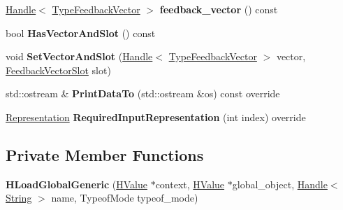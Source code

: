 \begin{DoxyCompactItemize}
\item 
\hyperlink{classv8_1_1internal_1_1_handle}{Handle}$<$ \hyperlink{classv8_1_1internal_1_1_type_feedback_vector}{Type\+Feedback\+Vector} $>$ {\bfseries feedback\+\_\+vector} () const \hypertarget{classv8_1_1internal_1_1_h_load_global_generic_a5fe6871107985c3d5630f3eb6931e637}{}\label{classv8_1_1internal_1_1_h_load_global_generic_a5fe6871107985c3d5630f3eb6931e637}

\item 
bool {\bfseries Has\+Vector\+And\+Slot} () const \hypertarget{classv8_1_1internal_1_1_h_load_global_generic_ad9cb94ceb7a09aad1b4e37ae0c44258e}{}\label{classv8_1_1internal_1_1_h_load_global_generic_ad9cb94ceb7a09aad1b4e37ae0c44258e}

\item 
void {\bfseries Set\+Vector\+And\+Slot} (\hyperlink{classv8_1_1internal_1_1_handle}{Handle}$<$ \hyperlink{classv8_1_1internal_1_1_type_feedback_vector}{Type\+Feedback\+Vector} $>$ vector, \hyperlink{classv8_1_1internal_1_1_feedback_vector_slot}{Feedback\+Vector\+Slot} slot)\hypertarget{classv8_1_1internal_1_1_h_load_global_generic_a83b3d860022539da6db17e80f33bf33c}{}\label{classv8_1_1internal_1_1_h_load_global_generic_a83b3d860022539da6db17e80f33bf33c}

\item 
std\+::ostream \& {\bfseries Print\+Data\+To} (std\+::ostream \&os) const  override\hypertarget{classv8_1_1internal_1_1_h_load_global_generic_a1a4dfadb3c4609d6666e2261aff6012d}{}\label{classv8_1_1internal_1_1_h_load_global_generic_a1a4dfadb3c4609d6666e2261aff6012d}

\item 
\hyperlink{classv8_1_1internal_1_1_representation}{Representation} {\bfseries Required\+Input\+Representation} (int index) override\hypertarget{classv8_1_1internal_1_1_h_load_global_generic_a94e7d9019b562d808545dee1a6e2d735}{}\label{classv8_1_1internal_1_1_h_load_global_generic_a94e7d9019b562d808545dee1a6e2d735}

\end{DoxyCompactItemize}
\subsection*{Private Member Functions}
\begin{DoxyCompactItemize}
\item 
{\bfseries H\+Load\+Global\+Generic} (\hyperlink{classv8_1_1internal_1_1_h_value}{H\+Value} $\ast$context, \hyperlink{classv8_1_1internal_1_1_h_value}{H\+Value} $\ast$global\+\_\+object, \hyperlink{classv8_1_1internal_1_1_handle}{Handle}$<$ \hyperlink{classv8_1_1internal_1_1_string}{String} $>$ name, Typeof\+Mode typeof\+\_\+mode)\hypertarget{classv8_1_1internal_1_1_h_load_global_generic_a6bc852b068e5890e8cfbff0bf0271924}{}\label{classv8_1_1internal_1_1_h_load_global_generic_a6bc852b068e5890e8cfbff0bf0271924}

\end{DoxyCompactItemize}
